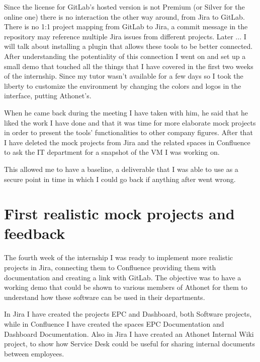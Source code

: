 	Since the license for GitLab's hosted version is not Premium (or Silver for the online one) there is no interaction the other way around, from Jira to GitLab.
	There is no 1:1 project mapping from GitLab to Jira, a commit message in the repository may reference multiple Jira issues from different projects.
	Later ... I will talk about installing a plugin that allows these tools to be better connected.
	After understanding the potentiality of this connection I went on and set up a small demo that touched all the things that I have covered in the first two weeks of the internship.
	Since my tutor wasn't available for a few days so I took the liberty to customize the environment by changing the colors and logos in the interface, putting Athonet's.
	
	
	When he came back during the meeting I have taken with him, he said that he liked the work I have done and that it was time for more elaborate mock projects in order to present the tools' functionalities to other company figures.
	After that I have deleted the mock projects from Jira and the related spaces in Confluence to ask the IT department for a snapshot of the VM I was working on.
	
	This allowed me to have a baseline, a deliverable that I was able to use as a secure point in time in which I could go back if anything after went wrong.
	
\section{First realistic mock projects and feedback}
	
	The fourth week of the internship I was ready to implement more realistic projects in Jira, connecting them to Confluence providing them with documentation and creating a link with GitLab.
	The objective was to have a working demo that could be shown to various members of Athonet for them to understand how these software can be used in their departments.

	In Jira I have created the projects EPC and Dashboard, both Software projects, while in Confluence I have created the spaces EPC Documentation and Dashboard Documentation.
	Also in Jira I have created an Athonet Internal Wiki project, to show how Service Desk could be useful for sharing internal documents between employees.
	
